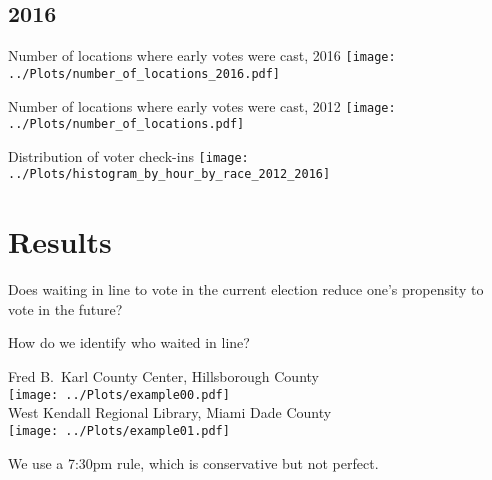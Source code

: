 \documentclass{beamer}
\begin{document}
		\subsection{2016}
		
		
		\begin{frame}				
		\end{frame}
		
		\begin{frame}				
		\centering 
		Number of locations where early votes were cast, 2016
		\texttt{[image: ../Plots/number\_of\_locations\_2016.pdf]}
		\end{frame}
		
		\begin{frame}				
		\centering 
		Number of locations where early votes were cast, 2012
		\texttt{[image: ../Plots/number\_of\_locations.pdf]}
		\end{frame}
		
		\begin{frame}				
			\centering 
			Distribution of voter check-ins
		\texttt{[image: ../Plots/histogram\_by\_hour\_by\_race\_2012\_2016]}
		\end{frame}


                \section{Results}
	
		\begin{frame}
		Does waiting in line to vote in the current election reduce one's propensity to vote in the future?
		\end{frame}

		\begin{frame}
                  How do we identify who waited in line?
		\end{frame}
 
		\begin{frame}				
			\centering 
			Fred B.\ Karl County Center, Hillsborough County\\
			\texttt{[image: ../Plots/example00.pdf]} \\
			West Kendall Regional Library, Miami Dade County\\
			\texttt{[image: ../Plots/example01.pdf]} \\ 
		\end{frame}

		\begin{frame}
                  We use a 7:30pm rule, which is conservative but not perfect.
		\end{frame}
\end{document}
